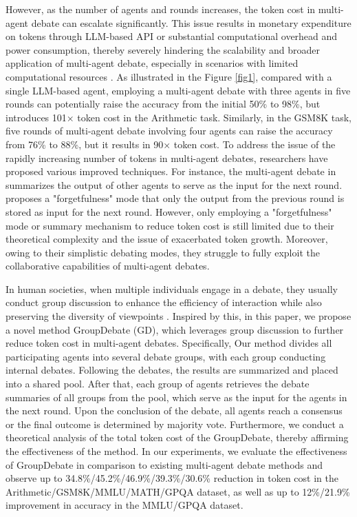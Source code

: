 However, as the number of agents and rounds increases, the token cost in multi-agent debate can escalate significantly. This issue results in monetary expenditure on tokens through LLM-based API or substantial computational overhead and power consumption, thereby severely hindering the scalability and broader application of multi-agent debate, especially in scenarios with limited computational resources \cite{guo2024large}.
As illustrated in the Figure \ref{fig1}, compared with a single LLM-based agent, employing a multi-agent debate with three agents in five rounds can potentially raise the accuracy from the initial 50\% to 98\%, but introduces 101× token cost in the Arithmetic \cite{brown2020language} task. Similarly, in the GSM8K \cite{cobbe2021training} task, five rounds of multi-agent debate involving four agents can raise the accuracy from 76\% to 88\%, but it results in 90× token cost. To address the issue of the rapidly increasing number of tokens in multi-agent debates, researchers have proposed various improved techniques. For instance, the multi-agent debate in \cite{du2023improving} summarizes the output of other agents to serve as the input for the next round. \cite{sun2023corex} proposes a "forgetfulness" mode that only the output from the previous round is stored as input for the next round. 
However, only employing a "forgetfulness" mode or summary mechanism to reduce token cost is still limited due to their theoretical complexity and the issue of exacerbated token growth. Moreover, owing to their simplistic debating modes, they struggle to fully exploit the collaborative capabilities of multi-agent debates.

In human societies, when multiple individuals engage in a debate, they usually conduct group discussion to enhance the efficiency of interaction while also preserving the diversity of viewpoints \cite{krueger2014focus}. Inspired by this, in this paper, we propose a novel method GroupDebate (GD), which leverages group discussion to further reduce token cost in multi-agent debates. Specifically, Our method divides all participating agents into several debate groups, with each group conducting internal debates. Following the debates, the results are summarized and placed into a shared pool. After that, each group of agents retrieves the debate summaries of all groups from the pool, which serve as the input for the agents in the next round. Upon the conclusion of the debate, all agents reach a consensus or the final outcome is determined by majority vote. Furthermore, we conduct a theoretical analysis of the total token cost of the GroupDebate, thereby affirming the effectiveness of the method. In our experiments, we evaluate the effectiveness of GroupDebate in comparison to existing multi-agent debate methods and observe up to 34.8\%/45.2\%/46.9\%/39.3\%/30.6\% reduction in token cost in the Arithmetic/GSM8K/MMLU/MATH/GPQA dataset, as well as up to 12\%/21.9\% improvement in accuracy in the MMLU/GPQA dataset. 

